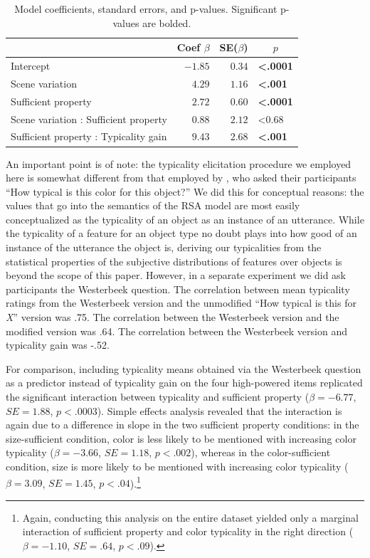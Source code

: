 \documentclass[11pt]{article}
\begin{document}
\begin{table}[!tbp]
\caption{Model coefficients, standard errors, and p-values. Significant p-values are bolded.}
\begin{center}
\begin{tabular}{lrrl}
\toprule
\multicolumn{1}{l}{}&\multicolumn{1}{c}{Coef $\beta$}&\multicolumn{1}{c}{SE($\beta$)}&\multicolumn{1}{c}{$p$}\tabularnewline
\midrule
Intercept&$-1.85$&$0.34$&\textbf{\textless .0001}\tabularnewline
Scene variation&$ 4.29$&$1.16$&\textbf{\textless .001}\tabularnewline
Sufficient property&$ 2.72$&$0.60$&\textbf{\textless .0001}\tabularnewline
Scene variation : Sufficient property&$ 0.88$&$2.12$&\textless 0.68\tabularnewline
Sufficient property : Typicality gain&$ 9.43$&$2.68$&\textbf{\textless .001}\tabularnewline
\bottomrule
\end{tabular}\end{center}
\label{tab:colortypicalityresults}
\end{table}

 An important point is of note: the typicality elicitation procedure we employed here is somewhat different from that employed by , who asked their participants ``How typical is this color for this object?'' We did this for conceptual reasons: the values that go into the semantics of the RSA model are most easily conceptualized as the typicality of an object as an instance of an utterance. While the typicality of a feature for an object type no doubt plays into how good of an instance of the utterance the object is, deriving our typicalities from the  statistical properties of the subjective distributions of features over objects is beyond the scope of this paper. However, in a separate experiment we did ask participants the Westerbeek question. The correlation between mean typicality ratings from the Westerbeek version and the unmodified ``How typical is this for \emph{X}'' version was .75. The correlation between the Westerbeek version and the modified version was .64. The correlation between the Westerbeek version and typicality gain was -.52.

For comparison, including typicality means obtained via the Westerbeek question as a predictor instead of typicality gain on the four high-powered items replicated the significant interaction between typicality and sufficient property ($\beta = -6.77$, $SE = 1.88$, $p < .0003$). Simple effects analysis revealed that the interaction is again due to a difference in slope in the two sufficient property conditions: in the size-sufficient condition, color is less likely to be mentioned with increasing color typicality   ($\beta = -3.66$, $SE = 1.18$, $p < .002$), whereas in the color-sufficient condition, size is more likely to be mentioned with increasing color typicality ($\beta = 3.09$, $SE = 1.45$, $p < .04$).\footnote{Again, conducting this analysis on the entire dataset yielded only a marginal interaction of sufficient property and color typicality in the right direction ($\beta = -1.10$, $SE = .64$, $p < .09$).}
\end{document}
